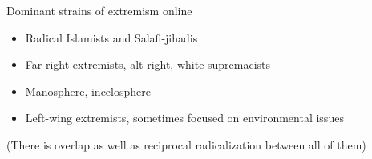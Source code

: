 \documentclass[nobackground,dvipsnames,table]{beamer}
\begin{document}
\begin{frame}{Dominant strains of extremism online}

\begin{itemize}
    \item Radical Islamists and Salafi-jihadis
    \item Far-right extremists, alt-right, white supremacists
    \item Manosphere, incelosphere
    \item Left-wing extremists, sometimes focused on environmental issues \newline 
\end{itemize}

(There is overlap as well as reciprocal radicalization between all of them)
\end{frame}
\end{document}
